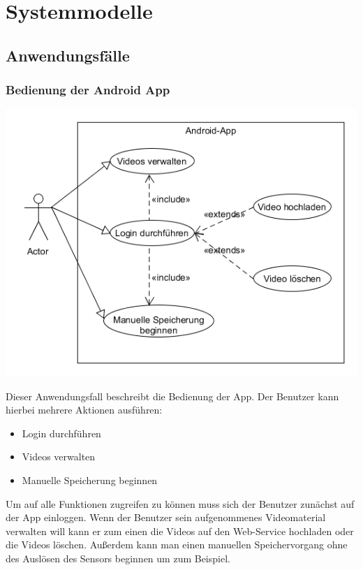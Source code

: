 \chapter{Systemmodelle}
\section{Anwendungsfälle}
\subsection{Bedienung der Android App}
\begin{center}
\includegraphics[width=1\textwidth]{subtopicsFuncspec/systemModels/App-AFD-UML.png}
\end{center}
Dieser Anwendungsfall beschreibt die Bedienung der App. 
Der Benutzer kann hierbei mehrere Aktionen ausführen:
\begin{itemize}
\item Login durchführen
\item Videos verwalten
\item Manuelle Speicherung beginnen
\end{itemize}
Um auf alle Funktionen zugreifen zu können muss sich der Benutzer zunächst auf der App einloggen. 
Wenn der Benutzer sein aufgenommenes Videomaterial verwalten will kann er zum einen die Videos auf den Web-Service hochladen oder die Videos löschen.
Außerdem kann man einen manuellen Speichervorgang ohne des Auslösen des Sensors beginnen um zum Beispiel.

